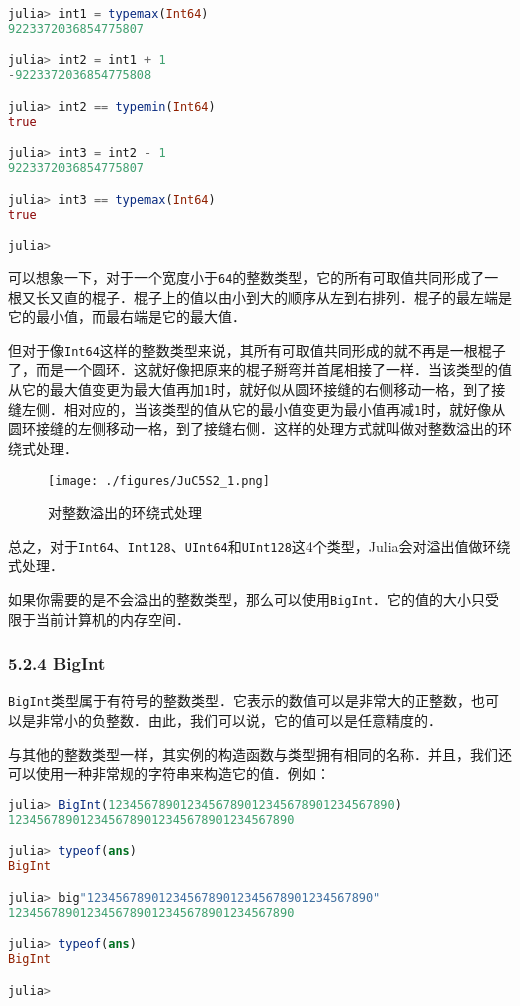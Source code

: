 \begin{lstlisting}[language=julia]
julia> int1 = typemax(Int64)
9223372036854775807

julia> int2 = int1 + 1
-9223372036854775808

julia> int2 == typemin(Int64)
true

julia> int3 = int2 - 1
9223372036854775807

julia> int3 == typemax(Int64)
true

julia> 
\end{lstlisting}

可以想象一下，对于一个宽度小于\verb|64|的整数类型，它的所有可取值共同形成了一根又长又直的棍子．棍子上的值以由小到大的顺序从左到右排列．棍子的最左端是它的最小值，而最右端是它的最大值．

但对于像\verb|Int64|这样的整数类型来说，其所有可取值共同形成的就不再是一根棍子了，而是一个圆环．这就好像把原来的棍子掰弯并首尾相接了一样．当该类型的值从它的最大值变更为最大值再加\verb|1|时，就好似从圆环接缝的右侧移动一格，到了接缝左侧．相对应的，当该类型的值从它的最小值变更为最小值再减\verb|1|时，就好像从圆环接缝的左侧移动一格，到了接缝右侧．这样的处理方式就叫做对整数溢出的环绕式处理．

\begin{figure}[ht]
\centering
\texttt{[image: ./figures/JuC5S2\_1.png]}
\caption{对整数溢出的环绕式处理} \label{JuC5S2_fig1}
\end{figure}

总之，对于\verb|Int64|、\verb|Int128|、\verb|UInt64|和\verb|UInt128|这4个类型，Julia会对溢出值做环绕式处理．

如果你需要的是不会溢出的整数类型，那么可以使用\verb|BigInt|．它的值的大小只受限于当前计算机的内存空间．

\subsubsection{5.2.4 BigInt}

\verb|BigInt|类型属于有符号的整数类型．它表示的数值可以是非常大的正整数，也可以是非常小的负整数．由此，我们可以说，它的值可以是任意精度的．

与其他的整数类型一样，其实例的构造函数与类型拥有相同的名称．并且，我们还可以使用一种非常规的字符串来构造它的值．例如：

\begin{lstlisting}[language=julia]
julia> BigInt(1234567890123456789012345678901234567890)
1234567890123456789012345678901234567890

julia> typeof(ans)
BigInt

julia> big"1234567890123456789012345678901234567890"
1234567890123456789012345678901234567890

julia> typeof(ans)
BigInt

julia>
\end{lstlisting}

